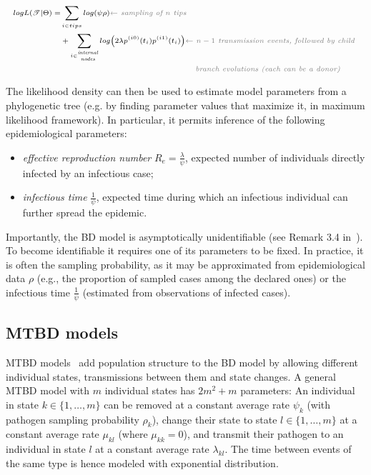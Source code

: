 \documentclass[a4paper,10pt]{article}
\begin{document}
\begin{equation}
\scriptsize
\begin{split}
log L(\mathscr{T}|\Theta) =  &\sum\limits_{i \in tips}  log(\psi \rho)  \textit{\color{gray} $\leftarrow$ sampling of $n$ tips} \\
 &+\sum\limits_{i \in \stackanchor{\tiny\textit{internal}}{\tiny\textit{nodes}}} log \big(2 \lambda p^{(i0)}(t_i)p^{(i1)}(t_i)\big)   \textit{\color{gray} $\leftarrow$ $n - 1$ transmission events, followed by child }\\
 & ~~~~~~~~~~~~~~~~~~~~~~~~~~~~~~~~~~~~~~~~~~~~~~~~~~\textit{\color{gray} branch evolutions (each can be a donor)}  \label{eq:mtbd_tree_likelihood}
\end{split}
\end{equation}

The likelihood density can then be used to estimate model parameters from a phylogenetic tree (e.g. by finding parameter values that maximize it, in maximum likelihood framework). In particular, it permits inference of the following epidemiological parameters: 

\begin{itemize}
\item \textit{effective reproduction number} $R_e = \frac{\lambda}{\psi}$, expected number of individuals directly infected by an infectious case;
\item \textit{infectious time} $\frac{1}{\psi}$, expected time during which an infectious individual can further spread the epidemic.
\end{itemize} 

Importantly, the BD model is asymptotically unidentifiable (see Remark 3.4 in~\citep{Stadler2009}). To become identifiable it requires one of its parameters to be fixed. In practice, it is often the sampling probability, as it may be approximated from epidemiological data $\rho$ (e.g., the proportion of sampled cases among the declared ones) or the infectious time $\frac{1}{\psi}$ (estimated from observations of infected cases). 

\subsection{MTBD models}
MTBD models~\citep{Stadler2013a} add population structure to the BD model by allowing different individual states, transmissions between them and state changes. A general MTBD model with $m$ individual states has $2m^2 + m$ parameters: An individual in state $k \in \{1, \ldots, m\}$ can be removed at a constant average rate $\psi_k$ (with pathogen sampling probability $\rho_k$), change their state to state $l \in \{1, \ldots, m\}$ at a constant average rate $\mu_{kl}$ (where $\mu_{kk} = 0$), and transmit their pathogen to an individual in state $l$ at a constant average rate $\lambda_{kl}$. The time between events of the same type is hence modeled with exponential distribution.
\end{document}
